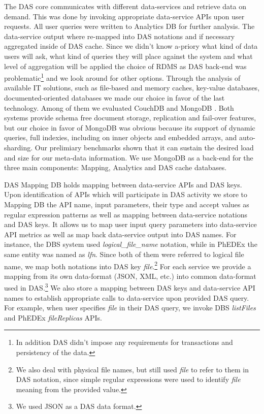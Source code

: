 \documentclass[a4paper]{jpconf}
\begin{document}
The DAS core communicates with different data-services and retrieve
data on demand. This was done by invoking appropriate data-service APIs
upon user requests. All user queries were written to Analytics DB
for further analysis. The data-service output where re-mapped into
DAS notations and if necessary aggregated inside of DAS cache.
Since we didn't know a-priory what kind of data users will ask, 
what kind of queries they will place against the system and what
level of aggregation will be applied the choice
of RDMS as DAS back-end was problematic\footnote{In addition DAS 
didn't impose any requirements for transactions and persistency of the data.} 
and we look around for other options. Through the analysis of available IT solutions, 
such as file-based and memory caches, 
key-value databases, documented-oriented databases we made our choice in favor 
of the last technology. Among of them we evaluated CouchDB \cite{CouchDB} and 
MongoDB \cite{MongoDB}. Both systems provide schema free document
storage, replication and fail-over features, but our choice in favor of 
MongoDB was obvious because its support of dynamic queries, 
full indexies, including on inner objects and embedded arrays,
and auto-sharding. Our prelimiary benchmarks shown that it can sustain
the desired load and size for our meta-data information. We use MongoDB as a back-end 
for the three main components: Mapping, Analytics and DAS cache databases. 

DAS Mapping DB holds mapping between data-service APIs and DAS keys. 
Upon identification of APIs which will participate in DAS activity 
we store to Mapping DB the API name, input parameters, their type and accept 
values as regular expression patterns as well as mapping between data-service 
notations and DAS keys. It allows us to map user input query parameters into
data-service API metrics as well as map back data-service output into DAS names.
For instance, the DBS system \cite{DBS}
used {\it logical\_file\_name} notation, while in PhEDEx
\cite{PhEDEx}
the same entity was named as {\it lfn}. Since both of them were referred to
logical file name, we map both notations into DAS key {\it file}.\footnote{We
also deal with physical file names, but still used {\it file} to refer to them in
DAS notation, since simple regular expressions were used to identify {\it file}
meaning from the provided value.}
For each service we provide a mapping from its own data-format (JSON, XML, etc.) into
common data-format used in DAS.\footnote{We used JSON as a DAS data format.}
We also store a mapping between DAS keys and data-service API names to
establish appropriate calls to data-service upon provided DAS query. For example,
when user specifies {\it file} in their DAS query, we invoke DBS 
{\it listFiles} and PhEDEx {\it fileReplicas} APIs. 
\end{document}
